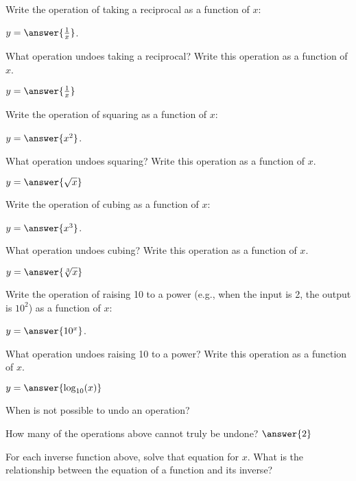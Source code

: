 \documentclass[number]{ximera}
\begin{document}
\begin{problem}
Write the operation of taking a reciprocal as a function of $x$:

$y= \answer{\frac{1}{x}}$.

What operation undoes taking a reciprocal? Write this operation as a function of $x$.

$y=\answer{\frac{1}{x}}$
\end{problem}

\begin{problem}
Write the operation of squaring as a function of $x$:

$y= \answer{x^2}$.

What operation undoes squaring? Write this operation as a function of $x$.

$y=\answer{\sqrt{x}}$
\end{problem}

\begin{problem}
Write the operation of cubing as a function of $x$:

$y= \answer{x^3}$.

What operation undoes cubing? Write this operation as a function of $x$.

$y=\answer{\sqrt[3]{x}}$
\end{problem}

\begin{problem}
Write the operation of raising 10 to a power (e.g., when the input is 2, the output is $10^2$) as a function of $x$:

$y= \answer{10^x}$.

What operation undoes raising 10 to a power? Write this operation as a function of $x$.

$y=\answer{\log_{10}(x)}$
\end{problem}

\begin{question}
When is not possible to undo an operation?
\begin{freeResponse}

\end{freeResponse}


How many of the operations above cannot truly be undone? $\answer{2}$
\end{question}


\begin{question}
For each inverse function above, solve that equation for $x$. What is the relationship between the equation of a function and its inverse?
\begin{freeResponse}

\end{freeResponse}

\end{question}
\end{document}
